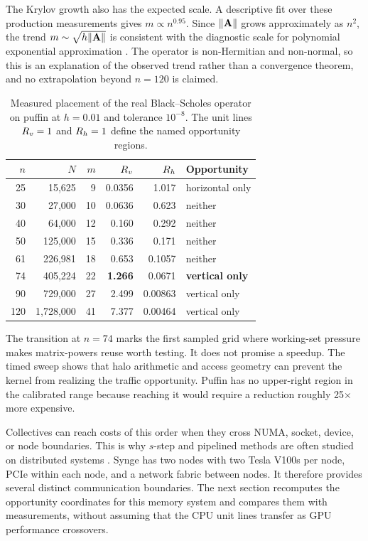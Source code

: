 The Krylov growth also has the expected scale. A descriptive fit over these production measurements gives $m\propto n^{0.95}$. Since $\lVert\mathbf{A}\rVert$ grows approximately as $n^2$, the trend $m\sim\sqrt{h\lVert\mathbf{A}\rVert}$ is consistent with the diagnostic scale for polynomial exponential approximation \cite{hochbruck-lubich-1997}. The operator is non-Hermitian and non-normal, so this is an explanation of the observed trend rather than a convergence theorem, and no extrapolation beyond $n=120$ is claimed.
\begin{table}[htbp!]
\centering
\caption{Measured placement of the real Black--Scholes operator on puffin at $h=0.01$ and tolerance $10^{-8}$. The unit lines $R_v=1$ and $R_h=1$ define the named opportunity regions.}
\label{tab:trajectory}
\small
\begin{tabular}{@{}rrrrrl@{}}
\toprule
$n$ & $N$ & $m$ & $R_v$ & $R_h$ & \textbf{Opportunity} \\
\midrule
25  & 15{,}625    & 9  & 0.0356 & 1.017   & horizontal only \\
30  & 27{,}000    & 10 & 0.0636 & 0.623   & neither \\
40  & 64{,}000    & 12 & 0.160  & 0.292   & neither \\
50  & 125{,}000   & 15 & 0.336  & 0.171   & neither \\
61  & 226{,}981   & 18 & 0.653  & 0.1057  & neither \\
74  & 405{,}224   & 22 & \textbf{1.266} & 0.0671 & \textbf{vertical only} \\
90  & 729{,}000   & 27 & 2.499  & 0.00863 & vertical only \\
120 & 1{,}728{,}000 & 41 & 7.377 & 0.00464 & vertical only \\
\bottomrule
\end{tabular}
\end{table}

The transition at $n=74$ marks the first sampled grid where working-set pressure makes matrix-powers reuse worth testing. It does not promise a speedup. The timed sweep shows that halo arithmetic and access geometry can prevent the kernel from realizing the traffic opportunity. Puffin has no upper-right region in the calibrated range because reaching it would require a reduction roughly 25$\times$ more expensive.

Collectives can reach costs of this order when they cross NUMA, socket, device, or node boundaries. This is why $s$-step and pipelined methods are often studied on distributed systems \cite{chronopoulos-gear-1989,demmel-2008,hoemmen-2010,carson-2015,ballard-2011,ghysels-vanroose-2014}. Synge has two nodes with two Tesla V100s per node, PCIe within each node, and a network fabric between nodes. It therefore provides several distinct communication boundaries. The next section recomputes the opportunity coordinates for this memory system and compares them with measurements, without assuming that the CPU unit lines transfer as GPU performance crossovers.
